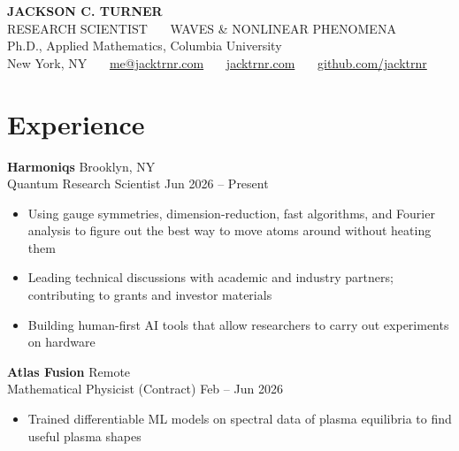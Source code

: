 \documentclass[10pt]{article}
\begin{document}
\fontsize{10.7pt}{13.4pt}\selectfont

\begin{center}
    {\Large\bfseries JACKSON C. TURNER}\\[3pt]
    {\color{accent}\small RESEARCH SCIENTIST \ \textbar\ \ WAVES  \& NONLINEAR PHENOMENA}\\[1pt]
    {\color{accent}\small Ph.D., Applied Mathematics, Columbia University}\\[4pt]
    {\small New York, NY \ \textbar\ \ \href{mailto:me@jacktrnr.com}{me@jacktrnr.com} \ \textbar\ \ \href{https://jacktrnr.com}{jacktrnr.com} \ \textbar\ \ \href{https://github.com/jacktrnr}{github.com/jacktrnr}}\\[2pt]
\end{center}

\vspace{-2pt}

\section*{Experience}

\textbf{Harmoniqs} \hfill Brooklyn, NY\\[1pt]
{\color{accent}Quantum Research Scientist} \hfill Jun 2026 -- Present
\begin{itemize}
\item Using gauge symmetries, dimension-reduction, fast algorithms, and Fourier analysis to figure out the best way to move atoms around without heating them
\item Leading technical discussions with academic and industry partners; contributing to grants and investor materials
\item Building human-first AI tools that allow researchers to carry out experiments on hardware
\end{itemize}
\vspace{2pt}

\textbf{Atlas Fusion} \hfill Remote\\[1pt]
{\color{accent}Mathematical Physicist (Contract)} \hfill Feb -- Jun 2026
\begin{itemize}
\item Trained differentiable ML models on spectral data of plasma equilibria to find useful plasma shapes
\end{itemize}
\vspace{2pt}
\end{document}
